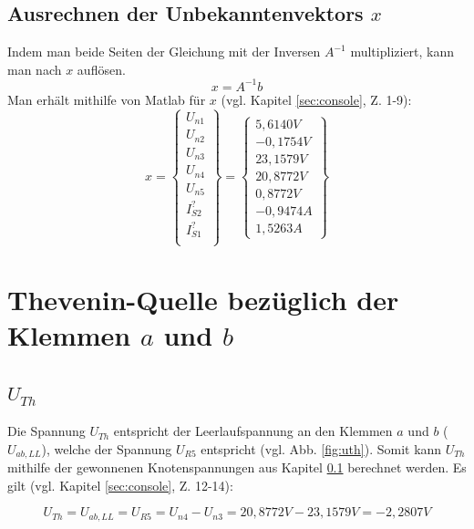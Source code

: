 \documentclass[11pt]{scrartcl}
\begin{document}
\subsection{Ausrechnen der Unbekanntenvektors $x$ } \label{sec:mat}
Indem man beide Seiten der Gleichung mit der Inversen $A^{-1}$ multipliziert, kann man nach $x$ auflösen.
\begin{equation*}
  x = A^{-1} b
\end{equation*}
Man erhält mithilfe von Matlab für $x$ (vgl. Kapitel \ref{sec:console}, Z. 1-9):
\begin{equation*}
  \renewcommand{\arraystretch}{1.5}
  x = \begin{Bmatrix}
    U_{n1} \\
    U_{n2} \\
    U_{n3} \\
    U_{n4} \\
    U_{n5} \\
    I_{S2}^? \\
    I_{S1}^? \\
  \end{Bmatrix} =
  \begin{Bmatrix}
    5,6140 \unit{V} \\
    -0,1754 \unit{V} \\
    23, 1579 \unit{V} \\
    20,8772 \unit{V} \\
    0,8772 \unit{V} \\
    -0,9474 \unit{A} \\
    1,5263 \unit{A}
  \end{Bmatrix}
\end{equation*}

\section{Thevenin-Quelle bezüglich der Klemmen $a$ und $b$}\label{sec:thev}
\subsection{$U_{Th}$}
Die Spannung $U_{Th}$ entspricht der Leerlaufspannung an den Klemmen $a$ und $b$ ($U_{ab,LL}$),
welche der Spannung $U_{R5}$ entspricht (vgl. Abb. \ref{fig:uth}).
Somit kann $U_{Th}$ mithilfe der gewonnenen Knotenspannungen aus Kapitel \ref{sec:mat} berechnet werden.
Es gilt (vgl. Kapitel \ref{sec:console}, Z. 12-14):

\begin{equation*}
  U_{Th} = U_{ab,LL} = U_{R5} = U_{n4} - U_{n3} = 20,8772 \unit{V} - 23,1579 \unit{V} = -2,2807 \unit{V}
\end{equation*}
\end{document}
